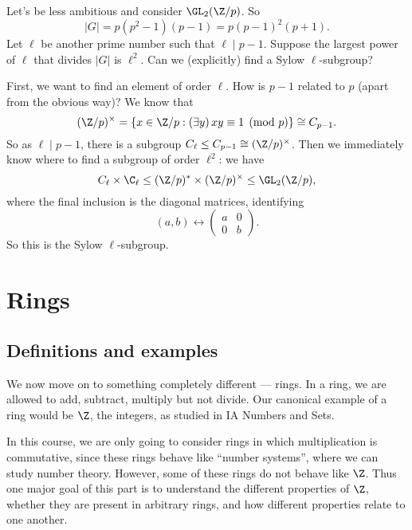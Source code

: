 \documentclass[a4paper]{article}
\begin{document}
\begin{eg}
  Let's be less ambitious and consider $\GL_2(\Z/p)$. So
  \[
    |G| = p(p^2 - 1)(p - 1) = p(p - 1)^2 (p + 1).
  \]
  Let $\ell$ be another prime number such that $\ell \mid p - 1$. Suppose the largest power of $\ell$ that divides $|G|$ is $\ell^2$. Can we (explicitly) find a Sylow $\ell$-subgroup?

  First, we want to find an element of order $\ell$. How is $p - 1$ related to $p$ (apart from the obvious way)? We know that
  \[
    (\Z/p)^\times = \{x \in \Z/p:(\exists y)\, xy \equiv 1 \pmod p\} \cong C_{p - 1}.
  \]
  So as $\ell\mid p - 1$, there is a subgroup $C_\ell \leq C_{p - 1} \cong (\Z/p)^\times$. Then we immediately know where to find a subgroup of order $\ell^2$: we have
  \[
    C_\ell \times \C_\ell \leq (\Z/p)^* \times (\Z/p)^\times \leq \GL_2(\Z/p),
  \]
  where the final inclusion is the diagonal matrices, identifying
  \[
    (a, b) \leftrightarrow
    \begin{pmatrix}
      a & 0\\
      0 & b
    \end{pmatrix}.
  \]
  So this is the Sylow $\ell$-subgroup.
\end{eg}

\section{Rings}
\subsection{Definitions and examples}
We now move on to something completely different --- rings. In a ring, we are allowed to add, subtract, multiply but not divide. Our canonical example of a ring would be $\Z$, the integers, as studied in IA Numbers and Sets.

In this course, we are only going to consider rings in which multiplication is commutative, since these rings behave like ``number systems'', where we can study number theory. However, some of these rings do not behave like $\Z$. Thus one major goal of this part is to understand the different properties of $\Z$, whether they are present in arbitrary rings, and how different properties relate to one another.
\end{document}
